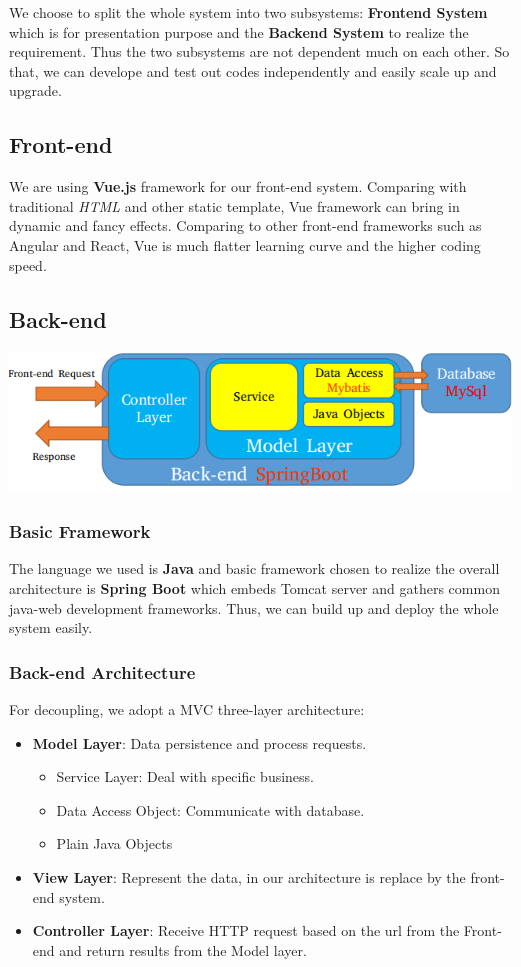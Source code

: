 \documentclass[12pt]{article}
\begin{document}
We choose to split the whole system into two subsystems: \textbf{Frontend System} which
is for presentation purpose and the \textbf{Backend System} to realize the requirement. Thus
the two subsystems are not dependent much on each other. So that, we can develope and test 
out codes independently and easily scale up and upgrade.
\subsection{Front-end}
We are using \textbf{Vue.js} framework for our front-end system. Comparing with traditional
\textit{HTML} and other static template, Vue framework can bring in dynamic and fancy effects. 
Comparing to other front-end frameworks such as Angular and React, 
Vue is much flatter learning curve and the higher coding speed.

\subsection{Back-end}
\centerline{\includegraphics[scale = 0.5]{pic/g2.png}}
\subsubsection{Basic Framework}
The language we used is \textbf{Java} and  basic framework chosen to realize the overall architecture is \textbf{Spring Boot} 
which  embeds Tomcat server and 
gathers common java-web development frameworks. Thus, we can build up and deploy the
whole system easily.
\subsubsection{Back-end Architecture}
For decoupling, we adopt a MVC three-layer architecture: 
\begin{itemize}
  \item \textbf{Model Layer}: Data persistence and process  requests.
  \begin{itemize}
    \item Service Layer: Deal with specific business.
    \item Data Access Object: Communicate with database.
    \item Plain Java Objects
  \end{itemize}
  \item \textbf{View Layer}: Represent the data, in our architecture is replace by the front-end system.
  \item \textbf{Controller Layer}: Receive HTTP request based on the url from the Front-end and return results from the Model layer.
\end{itemize}
\end{document}
